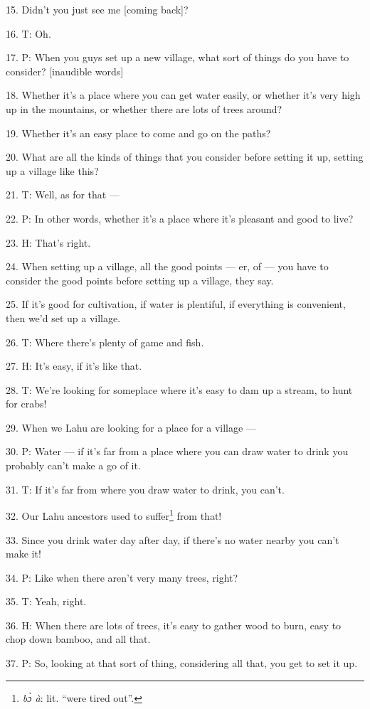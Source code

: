 15. Didn't you just see me [coming back]?

16. T: Oh.

17. P: When you guys set up a new village, what sort of things do you have to consider?
[inaudible words]

18. Whether it's a place where you can get water easily, or whether it's very high
up in the mountains, or whether there are lots of trees around?

19. Whether it's an easy place to come and go on the paths?

20. What are all the kinds of things that you consider before setting it up, setting
up a village like this?

21. T: Well, as for that ---

22. P: In other words, whether it's a place where it's pleasant and good to live?

23. H: That's right.

24. When setting up a village, all the good points --- er, of --- you have to consider
the good points before setting up a village, they say.

25. If it's good for cultivation, if water is plentiful, if everything is convenient,
then we'd set up a village.

26. T: Where there's plenty of game and fish.

27. H: It's easy, if it's like that.

28. T: We're looking for someplace where it's easy to dam up a stream, to hunt
for crabs!

29. When we Lahu are looking for a place for a village ---

30. P: Water --- if it's far from a place where you can draw water to drink you
probably can't make a go of it.

31. T: If it's far from where you draw water to drink, you can't.

32. Our Lahu ancestors used to suffer\footnote{\textit{bɔ̀ à}: lit. ``were tired out''.} from that!

33. Since you drink water day after day, if there's no water nearby you can't make
it!

34. P: Like when there aren't very many trees, right?

35. T: Yeah, right.

36. H: When there are lots of trees, it's easy to gather wood to burn, easy to
chop down bamboo, and all that.

37. P: So, looking at that sort of thing, considering all that, you get to set
it up.

